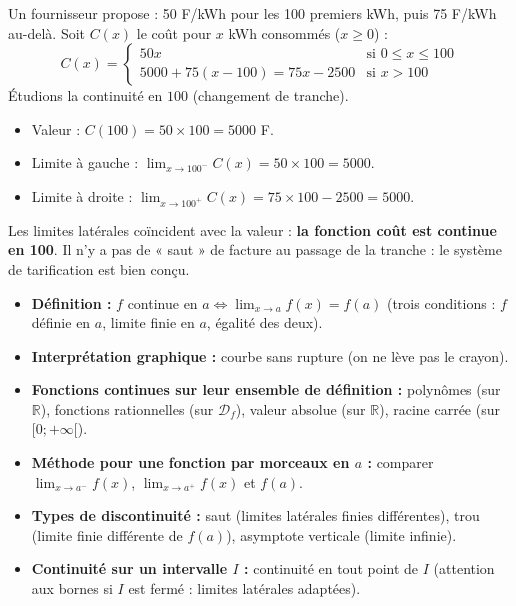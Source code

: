 \documentclass[11pt]{article}
\newcounter{popsec}
\newcounter{popsub}
\newcommand{\courssub}[1]{%
  \stepcounter{popsub}%
  \par\vspace{9pt}\noindent{\popxbold\fontsize{11.5}{13}\selectfont\color{popink}{\color{poporange}\thepopsec.\thepopsub}\hspace{6pt}#1}\par\nopagebreak\vspace{4pt}
}
\begin{document}
\begin{exemplebox}
Un fournisseur propose : 50 F/kWh pour les 100 premiers kWh, puis 75 F/kWh au-delà.
Soit $C(x)$ le coût pour $x$ kWh consommés ($x \ge 0$) :
\[
C(x) = \begin{cases}
50x & \text{si } 0 \le x \le 100 \\
5000 + 75(x-100) = 75x - 2500 & \text{si } x > 100
\end{cases}
\]
Étudions la continuité en $100$ (changement de tranche).
\begin{itemize}
    \item Valeur : $C(100) = 50 \times 100 = 5000$ F.
    \item Limite à gauche : $\lim_{x\to 100^-} C(x) = 50\times 100 = 5000$.
    \item Limite à droite : $\lim_{x\to 100^+} C(x) = 75\times 100 - 2500 = 5000$.
\end{itemize}
Les limites latérales coïncident avec la valeur : \textbf{la fonction coût est continue en 100}. Il n'y a pas de « saut » de facture au passage de la tranche : le système de tarification est bien conçu.
\end{exemplebox}

\courssub{Synthèse de la section}
\begin{aretenir}
\begin{itemize}
    \item \textbf{Définition :} $f$ continue en $a \iff \lim_{x\to a} f(x) = f(a)$ (trois conditions : $f$ définie en $a$, limite finie en $a$, égalité des deux).
    \item \textbf{Interprétation graphique :} courbe sans rupture (on ne lève pas le crayon).
    \item \textbf{Fonctions continues sur leur ensemble de définition :} polynômes (sur $\mathbb{R}$), fonctions rationnelles (sur $\mathcal{D}_f$), valeur absolue (sur $\mathbb{R}$), racine carrée (sur $[0;+\infty[$).
    \item \textbf{Méthode pour une fonction par morceaux en $a$ :} comparer $\lim_{x\to a^-}f(x)$, $\lim_{x\to a^+}f(x)$ et $f(a)$.
    \item \textbf{Types de discontinuité :} saut (limites latérales finies différentes), trou (limite finie différente de $f(a)$), asymptote verticale (limite infinie).
    \item \textbf{Continuité sur un intervalle $I$ :} continuité en tout point de $I$ (attention aux bornes si $I$ est fermé : limites latérales adaptées).
\end{itemize}
\end{aretenir}
\end{document}
